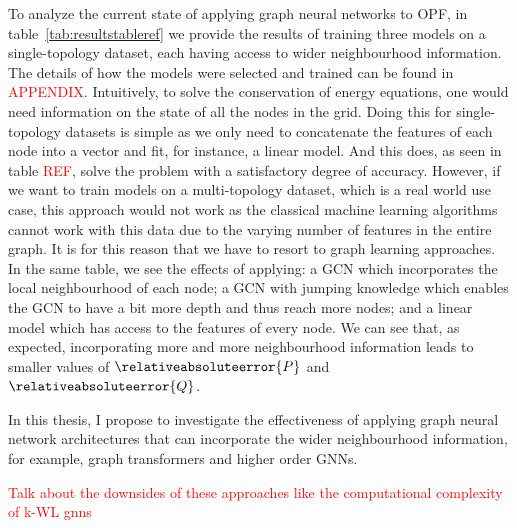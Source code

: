 To analyze the current state of applying graph neural networks to
OPF, in table~\ref{tab:resultstableref} we provide the results of training three models on a single-topology dataset, each having access to
wider neighbourhood information.
The details of how the models were selected and trained can be found in \textcolor{red}{APPENDIX}.
Intuitively, to solve the conservation of energy equations, one would need information on the
state of all the nodes in the grid.
Doing this for single-topology datasets is simple as we only need to concatenate the
features of each node into a vector and fit, for instance, a linear model.
And this does, as seen in table \textcolor{red}{REF},
solve the problem with a satisfactory degree of accuracy.
However, if we want to train models on a multi-topology dataset, which is a real world use case,
this approach would not work as the classical machine learning algorithms cannot work with
this data due to the varying number of features in the entire graph.
It is for this reason that we have to resort to graph learning approaches.
In the same table, we see the effects of applying:
a GCN which incorporates the local neighbourhood of each node; a GCN with jumping
knowledge which enables the GCN to have a bit more depth and thus reach more nodes;
and a linear model which has access to the features of every node.
We can see that, as expected, incorporating more and more neighbourhood information leads to
smaller values of $\relativeabsoluteerror{P}$ and $\relativeabsoluteerror{Q}$.

In this thesis, I propose to investigate the effectiveness of applying graph neural network
architectures that can incorporate the wider neighbourhood information, for example,
graph transformers and higher order GNNs.

\textcolor{red}{Talk about the downsides of these approaches like the computational complexity of k-WL gnns}
